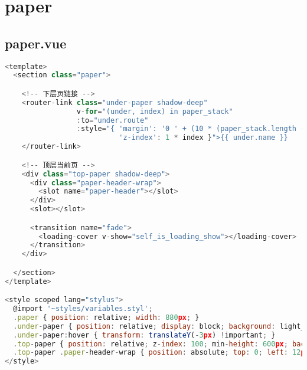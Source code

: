 \chapter{paper}


\section{paper.vue}





\begin{lstlisting}[language=JavaScript]
<template>
  <section class="paper">

    <!-- 下层页链接 -->
    <router-link class="under-paper shadow-deep"
                 v-for="(under, index) in paper_stack"
                 :to="under.route"
                 :style="{ 'margin': '0 ' + (10 * (paper_stack.length - index)) + 'px -4px',
                           'z-index': 1 * index }">{{ under.name }}
    </router-link>

    <!-- 顶层当前页 -->
    <div class="top-paper shadow-deep">
      <div class="paper-header-wrap">
        <slot name="paper-header"></slot>
      </div>
      <slot></slot>

      <transition name="fade">
        <loading-cover v-show="self_is_loading_show"></loading-cover>
      </transition>
    </div>

  </section>
</template>

<style scoped lang="stylus">
  @import '~styles/variables.styl';
  .paper { position: relative; width: 880px; }
  .under-paper { position: relative; display: block; background: light_gray_2; color: gray_1; line-height: 28px; padding: 0 12px 2px; border-radius: 1px 1px 0 0; cursor: pointer; transition: all .2s ease; }
  .under-paper:hover { transform: translateY(-3px) !important; }
  .top-paper { position: relative; z-index: 100; min-height: 600px; background: light_gray_3; padding: 50px 40px; color: black; border-radius: 1px; }
  .top-paper .paper-header-wrap { position: absolute; top: 0; left: 12px; right: 12px; padding: 6px 0 0; }
</style>


\end{lstlisting}
